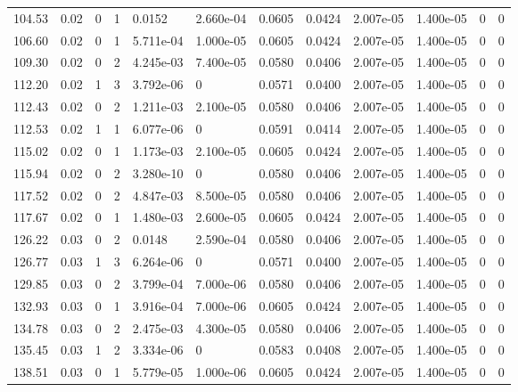 \documentclass[preview]{standalone}
\begin{document}
{{{\begin{tabular}{L{1.2cm}C{1.2cm} C{0.3cm}C{0.5cm} C{1.4cm}C{1.4cm} C{1.4cm}C{1.4cm} C{1.6cm}C{1.6cm} C{1.6cm}C{1.6cm}}
  104.53  &  0.02  & 0     &  1 &  0.0152  & 2.660e-04  &  0.0605&   0.0424& 2.007e-05 & 1.400e-05   &  0 & 0  \\ 
  106.60  &  0.02  & 0     &  1 &  5.711e-04  & 1.000e-05  &  0.0605&   0.0424& 2.007e-05 & 1.400e-05   &  0 & 0  \\ 
  109.30  &  0.02  & 0     &  2 &  4.245e-03  & 7.400e-05  &  0.0580&   0.0406& 2.007e-05 & 1.400e-05   &  0 & 0  \\ 
  112.20  &  0.02  & 1     &  3 &  3.792e-06  & 0  &  0.0571&   0.0400& 2.007e-05 & 1.400e-05   &  0 & 0  \\ 
  112.43  &  0.02  & 0     &  2 &  1.211e-03  & 2.100e-05  &  0.0580&   0.0406& 2.007e-05 & 1.400e-05   &  0 & 0  \\ 
  112.53  &  0.02  & 1     &  1 &  6.077e-06  & 0  &  0.0591&   0.0414& 2.007e-05 & 1.400e-05   &  0 & 0  \\ 
  115.02  &  0.02  & 0     &  1 &  1.173e-03  & 2.100e-05  &  0.0605&   0.0424& 2.007e-05 & 1.400e-05   &  0 & 0  \\ 
  115.94  &  0.02  & 0     &  2 &  3.280e-10  & 0  &  0.0580&   0.0406& 2.007e-05 & 1.400e-05   &  0 & 0  \\ 
  117.52  &  0.02  & 0     &  2 &  4.847e-03  & 8.500e-05  &  0.0580&   0.0406& 2.007e-05 & 1.400e-05   &  0 & 0  \\ 
  117.67  &  0.02  & 0     &  1 &  1.480e-03  & 2.600e-05  &  0.0605&   0.0424& 2.007e-05 & 1.400e-05   &  0 & 0  \\ 
  126.22  &  0.03  & 0     &  2 &  0.0148  & 2.590e-04  &  0.0580&   0.0406& 2.007e-05 & 1.400e-05   &  0 & 0  \\ 
  126.77  &  0.03  & 1     &  3 &  6.264e-06  & 0  &  0.0571&   0.0400& 2.007e-05 & 1.400e-05   &  0 & 0  \\ 
  129.85  &  0.03  & 0     &  2 &  3.799e-04  & 7.000e-06  &  0.0580&   0.0406& 2.007e-05 & 1.400e-05   &  0 & 0  \\ 
  132.93  &  0.03  & 0     &  1 &  3.916e-04  & 7.000e-06  &  0.0605&   0.0424& 2.007e-05 & 1.400e-05   &  0 & 0  \\ 
  134.78  &  0.03  & 0     &  2 &  2.475e-03  & 4.300e-05  &  0.0580&   0.0406& 2.007e-05 & 1.400e-05   &  0 & 0  \\ 
  135.45  &  0.03  & 1     &  2 &  3.334e-06  & 0  &  0.0583&   0.0408& 2.007e-05 & 1.400e-05   &  0 & 0  \\ 
  138.51  &  0.03  & 0     &  1 &  5.779e-05  & 1.000e-06  &  0.0605&   0.0424& 2.007e-05 & 1.400e-05   &  0 & 0  \\ 

\end{tabular}}}}
\end{document}
